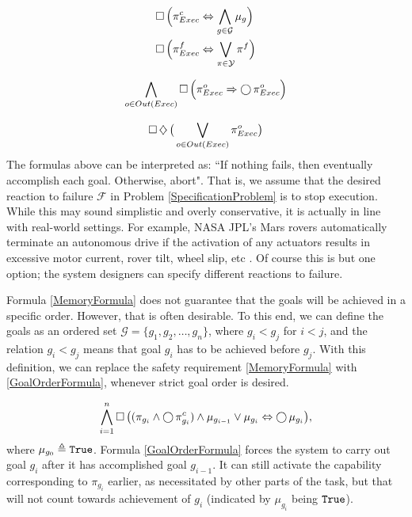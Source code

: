 \begin{subequations}
	\label{SMOutcomeFormulas}
	\begin{align}
		\operatorname{\Box} \Big( \pi_{Exec}^{c} &\Leftrightarrow \bigwedge \limits_{g \in \mathcal{G}} \mu_g \Big) \label{SuccessfulOutcomeFormula}\\
		\operatorname{\Box} \Big( \pi_{Exec}^{f} &\Leftrightarrow \bigvee \limits_{\pi \in \mathcal{Y}} \pi^f \Big) \label{FailedOutcomeFormula}	 
	\end{align}
\end{subequations}

\begin{equation}\label{SMOutcomePersistenceFormula}
	\bigwedge \limits_{o \in Out(Exec)} \operatorname{\Box} \Big( \pi_{Exec}^{o} \Rightarrow \operatorname{\bigcirc} \pi_{Exec}^{o} \Big)
\end{equation}

\begin{equation}\label{SuccessLivenessFormula}
	\operatorname{\Box} \operatorname{\diamondsuit} \big( \bigvee \limits_{o \in Out(Exec)} \pi_{Exec}^{o} \big)
\end{equation}
The formulas above can be interpreted as: ``If nothing fails, then eventually accomplish each goal. Otherwise, abort".
That is, we assume that the desired reaction to failure $\mathcal{F}$ in Problem \ref{SpecificationProblem} is to stop execution.
While this may sound simplistic and overly conservative, it is actually in line with real-world settings.
For example, NASA JPL's Mars rovers automatically terminate an autonomous drive if the activation of any actuators results in excessive motor current, rover tilt, wheel slip, etc \cite{MER2006Aero}.
Of course this is but one option; the system designers can specify different reactions to failure.

Formula \eqref{MemoryFormula} does not guarantee that the goals will be achieved in a specific order.
However, that is often desirable.
To this end, we can define the goals as an ordered set $\mathcal{G} = \{ g_1, g_2, \ldots, g_n \}$, where $g_i < g_j$ for $i<j$, and the relation $g_i < g_j$ means that goal $g_i$ has to be achieved before $g_j$.
With this definition, we can replace the safety requirement \eqref{MemoryFormula} with \eqref{GoalOrderFormula}, whenever strict goal order is desired.

\begin{equation}\label{GoalOrderFormula}
	\bigwedge \limits_{i = 1}^n \operatorname{\Box} \big( (\pi_{g_i} \wedge \operatorname{\bigcirc} \pi_{g_i}^c) \wedge \mu_{g_{i-1}} \vee \mu_{g_i} \Leftrightarrow \operatorname{\bigcirc} \mu_{g_i} \big),
\end{equation}
where $\mu_{g_0} \triangleq \mathtt{True}$.
Formula \eqref{GoalOrderFormula} forces the system to carry out goal $g_i$ after it has accomplished goal $g_{i-1}$.
It can still activate the capability corresponding to $\pi_{g_i}$ earlier, as necessitated by other parts of the task, but that will not count towards achievement of $g_i$ (indicated by $\mu_{g_i}$ being $\mathtt{True}$).

